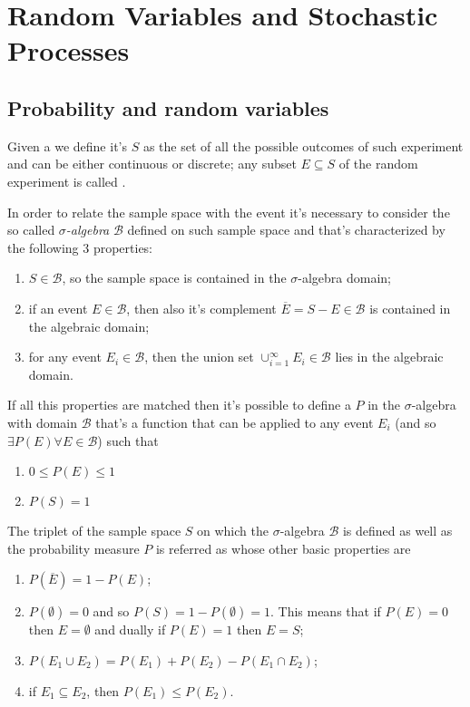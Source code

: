 \chapter{Random Variables and Stochastic Processes}
\section{Probability and random variables}
	Given a  we define it's  $S$ as the set of all the possible outcomes of such experiment and can be either continuous or discrete; any subset $E\subseteq S$ of the random experiment is called .
	
	In order to relate the sample space with the event it's necessary to consider the so called \textit{$\sigma$-algebra} $\mathscr B$ defined on such sample space and that's characterized by the following 3 properties:
	\begin{enumerate}[\itshape i)]
		\item $S \in \mathscr B$, so the sample space is contained in the $\sigma$-algebra domain;
		\item if an event $E \in \mathscr B$, then also it's complement $\overline E = S - E \in \mathscr B$ is contained in the algebraic domain;
		\item for any event $E_i \in \mathscr B$, then the union set $\cup_{i=1}^\infty E_i \in \mathscr B$ lies in the algebraic domain.
	\end{enumerate}

	If all this properties are matched then it's possible to define a  $P$ in the $\sigma$-algebra with domain $\mathscr B$ that's a function that can be applied to any event $E_i$ (and so $\exists P(E) \forall E \in \mathscr B$) such that
	\begin{enumerate}[\itshape i)]
		\item $0\leq P(E) \leq 1$ 
		\item $P(S) = 1$
	\end{enumerate}
	
	The triplet of the sample space $S$ on which the $\sigma$-algebra $\mathscr B$ is defined as well as the probability measure $P$ is referred as  whose other basic properties are
	\begin{enumerate}[\itshape i)]
		\item $P(\overline E) = 1 - P(E)$;
		\item $P(\emptyset) = 0$ and so $P(S) = 1 - P(\emptyset) = 1$. This means that if $P(E) = 0$ then $E = \emptyset$ and dually if $P(E) = 1$ then $E = S$;
		\item $P(E_1 \cup E_2) = P(E_1) + P(E_2) - P(E_1 \cap E_2)$;
		\item if $E_1 \subseteq E_2$, then $P(E_1) \leq P(E_2)$.
	\end{enumerate}
	
